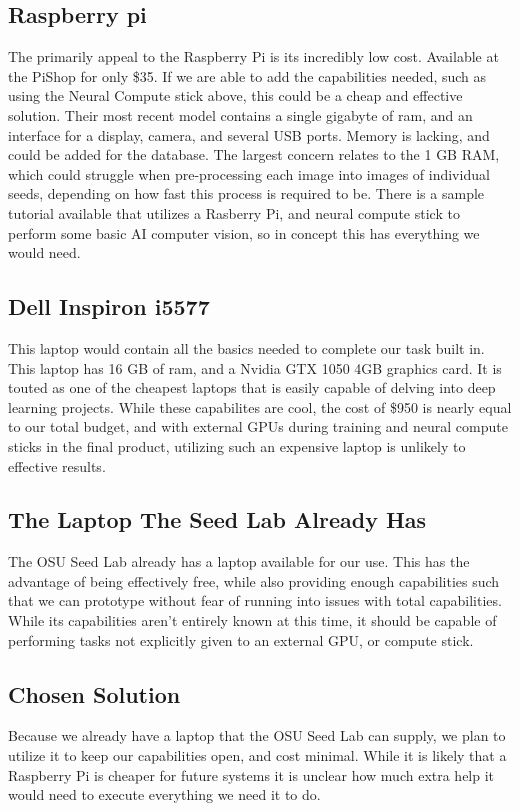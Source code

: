 \documentclass[onecolumn, draftclsnofoot,10pt, compsoc]{IEEEtran}
\begin{document}
\subsection{Raspberry pi}
The primarily appeal to the Raspberry Pi is its incredibly low cost. Available at the PiShop for only \$35.\cite{raspi}  If we are able to add the capabilities needed, such as using the Neural Compute stick above, this could be a cheap and effective solution. Their most recent model contains a single gigabyte of ram, and an interface for a display, camera, and several USB ports. \cite{raspi} Memory is lacking, and could be added for the database. The largest concern relates to the 1 GB RAM, which could struggle when pre-processing each image into images of individual seeds, depending on how fast this process is required to be. There is a sample tutorial available that utilizes a Rasberry Pi, and neural compute stick to perform some basic AI computer vision, so in concept this has everything we would need. \cite{piplusncs}
\subsection{Dell Inspiron i5577}
This laptop would contain all the basics needed to complete our task built in. This laptop has 16 GB of ram, and a Nvidia GTX 1050 4GB graphics card.\cite{laptop} It is touted as one of the cheapest laptops that is easily capable of delving into deep learning projects. \cite{laptop} While these capabilites are cool, the cost of \$950 is nearly equal to our total budget, and with external GPUs during training and neural compute sticks in the final product, utilizing such an expensive laptop is unlikely to effective results.
\subsection{The Laptop The Seed Lab Already Has}
The OSU Seed Lab already has a laptop available for our use. This has the advantage of being effectively free, while also providing enough capabilities such that we can prototype without fear of running into issues with total capabilities. While its capabilities aren't entirely known at this time, it should be capable of performing tasks not explicitly given to an external GPU, or compute stick.
\subsection{Chosen Solution}
Because we already have a laptop that the OSU Seed Lab can supply, we plan to utilize it to keep our capabilities open, and cost minimal. While it is likely that a Raspberry Pi is cheaper for future systems it is unclear how much extra help it would need to execute everything we need it to do.



\end{document}
